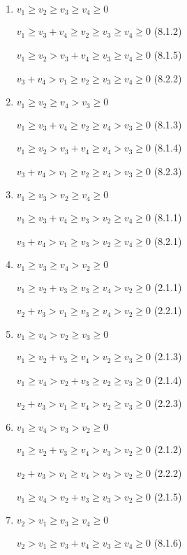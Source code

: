 \documentclass{article}
\begin{document}
\begin{enumerate}

    \item $v_1\geq{v_2}\geq{v_3}\geq{v_4}\geq{0}$

    $v_1\geq{v_3+v_4}\geq{v_2}\geq{v_3}\geq{v_4}\geq{0}$ (8.1.2)
    
    $v_1\geq{v_2}>v_3+v_4\geq{v_3}\geq{v_4}\geq{0}$ (8.1.5)
    
    $v_3+v_4>v_1\geq{v_2}\geq{v_3}\geq{v_4}\geq{0}$ (8.2.2)

    \item $v_1\geq{v_2}\geq{v_4}>v_3\geq{0}$

    $v_1\geq{v_3+v_4}\geq{v_2}\geq{v_4}>v_3\geq{0}$ (8.1.3)
    
    $v_1\geq{v_2}>v_3+v_4\geq{v_4}>v_3\geq{0}$ (8.1.4)
    
    $v_3+v_4>v_1\geq{v_2}\geq{v_4}>v_3\geq{0}$ (8.2.3)

    \item $v_1\geq{v_3}>v_2\geq{v_4}\geq{0}$

    $v_1\geq{v_3+v_4}\geq{v_3}>v_2\geq{v_4}\geq{0}$ (8.1.1)
    
    $v_3+v_4>v_1\geq{v_3}>v_2\geq{v_4}\geq{0}$ (8.2.1)

    \item $v_1\geq{v_3}\geq{v_4}>v_2\geq{0}$

$v_1\geq{v_2+v_3}\geq{v_3}\geq{v_4}>v_2\geq{0}$ (2.1.1)

$v_2+v_3>v_1\geq{v_3}\geq{v_4}>v_2\geq{0}$ (2.2.1)

    \item $v_1\geq{v_4}>v_2\geq{v_3}\geq{0}$

    $v_1\geq{v_2+v_3}\geq{v_4}>v_2\geq{v_3}\geq{0}$ (2.1.3)

    $v_1\geq{v_4}>v_2+v_3\geq{v_2}\geq{v_3}\geq{0}$ (2.1.4)

    $v_2+v_3>v_1\geq{v_4}>v_2\geq{v_3}\geq{0}$ (2.2.3)
    
\item $v_1\geq{v_4}>v_3>v_2\geq{0}$

    $v_1\geq{v_2+v_3}\geq{v_4}>v_3>v_2\geq{0}$ (2.1.2)

    $v_2+v_3>v_1\geq{v_4}>v_3>v_2\geq{0}$ (2.2.2)

    $v_1\geq{v_4}>v_2+v_3\geq{v_3}>v_2\geq{0}$ (2.1.5)

    \item $v_2>v_1\geq{v_3}\geq{v_4}\geq{0}$

    $v_2>v_1\geq{v_3+v_4}\geq{v_3}\geq{v_4}\geq{0}$ (8.1.6)


\end{enumerate}
\end{document}
